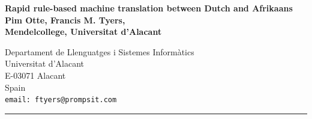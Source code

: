 \documentclass[a0,landscape]{a0poster}
\begin{document}

\begin{minipage}[b]{0.65\linewidth} 
\veryHuge \bf 
\textsf{Rapid rule-based machine translation between Dutch and Afrikaans}
\\[1cm]
\huge \bf Pim Otte, Francis M. Tyers,\\
\huge \rm Mendelcollege, Universitat d'Alacant
\end{minipage}
\begin{minipage}[b]{0.35\linewidth} 
\Large Departament de Llenguatges i Sistemes Inform\`{a}tics\\
Universitat d'Alacant\\
E-03071 Alacant\\
Spain\\
\tt{email: ftyers@prompsit.com}
\end{minipage}
\vspace{0.3cm}
\hrule
\vspace{0.3cm}
%
\end{document}
